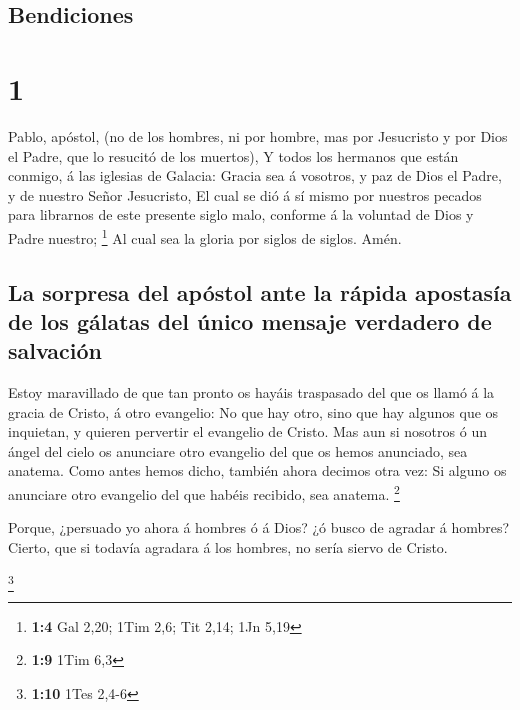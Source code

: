 \hypertarget{bendiciones}{%
\subsection{Bendiciones}\label{bendiciones}}

\hypertarget{section}{%
\section{1}\label{section}}

 Pablo, apóstol, (no de los hombres, ni por hombre, mas
por Jesucristo y por Dios el Padre, que lo resucitó de los muertos),
 Y todos los hermanos que están conmigo, á las iglesias de
Galacia:  Gracia sea á vosotros, y paz de Dios el Padre, y
de nuestro Señor Jesucristo,  El cual se dió á sí mismo
por nuestros pecados para librarnos de este presente siglo malo,
conforme á la voluntad de Dios y Padre nuestro; \footnote{\textbf{1:4}
  Gal 2,20; 1Tim 2,6; Tit 2,14; 1Jn 5,19}  Al cual sea la
gloria por siglos de siglos. Amén.

\hypertarget{la-sorpresa-del-apuxf3stol-ante-la-ruxe1pida-apostasuxeda-de-los-guxe1latas-del-uxfanico-mensaje-verdadero-de-salvaciuxf3n}{%
\subsection{La sorpresa del apóstol ante la rápida apostasía de los
gálatas del único mensaje verdadero de
salvación}\label{la-sorpresa-del-apuxf3stol-ante-la-ruxe1pida-apostasuxeda-de-los-guxe1latas-del-uxfanico-mensaje-verdadero-de-salvaciuxf3n}}

 Estoy maravillado de que tan pronto os hayáis traspasado
del que os llamó á la gracia de Cristo, á otro evangelio: 
No que hay otro, sino que hay algunos que os inquietan, y quieren
pervertir el evangelio de Cristo.  Mas aun si nosotros ó
un ángel del cielo os anunciare otro evangelio del que os hemos
anunciado, sea anatema.  Como antes hemos dicho, también
ahora decimos otra vez: Si alguno os anunciare otro evangelio del que
habéis recibido, sea anatema. \footnote{\textbf{1:9} 1Tim 6,3}

 Porque, ¿persuado yo ahora á hombres ó á Dios? ¿ó busco
de agradar á hombres? Cierto, que si todavía agradara á los hombres, no
sería siervo de Cristo.

\footnote{\textbf{1:10} 1Tes 2,4-6}

